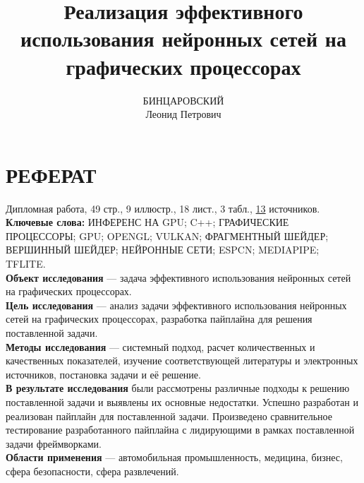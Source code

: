 \documentclass[a4paper,14pt]{extreport}
\title{Реализация эффективного использования нейронных сетей на
графических процессорах}
\author{БИНЦАРОВСКИЙ\\
        Леонид Петрович}
\begin{document}
    \maketitle\newpage
    \setcounter{page}{2}

    \chapter*{РЕФЕРАТ}
    Дипломная работа, 49 стр., 9 иллюстр., 18 лист., 3 табл., \hyperlink{sources}{13} источников.\\
    \textbf{Ключевые слова:} ИНФЕРЕНС НА GPU; C++; ГРАФИЧЕСКИЕ ПРОЦЕССОРЫ; GPU; OPENGL; VULKAN; ФРАГМЕНТНЫЙ ШЕЙДЕР; ВЕРШИННЫЙ ШЕЙДЕР; НЕЙРОННЫЕ СЕТИ; ESPCN; MEDIAPIPE; TFLITE.\\
    \textbf{Объект исследования} — задача эффективного использования нейронных сетей на
    графических процессорах.\\
    \textbf{Цель исследования} — анализ задачи эффективного использования нейронных сетей на
    графических процессорах, разработка пайплайна для решения поставленной задачи.\\
    \textbf{Методы исследования} — системный подход, расчет количественных и качественных показателей, изучение соответствующей литературы и электронных источников, постановка задачи и её решение.\\
    \textbf{В результате исследования} были рассмотрены различные подходы к решению поставленной задачи и выявлены их основные недостатки. Успешно разработан и реализован пайплайн для поставленной задачи. Произведено сравнительное тестирование разработанного пайплайна с лидирующими в рамках поставленной задачи фреймворками. \\
    \textbf{Области применения} — автомобильная промышленность, медицина, бизнес, сфера безопасности, сфера развлечений.
\end{document}
